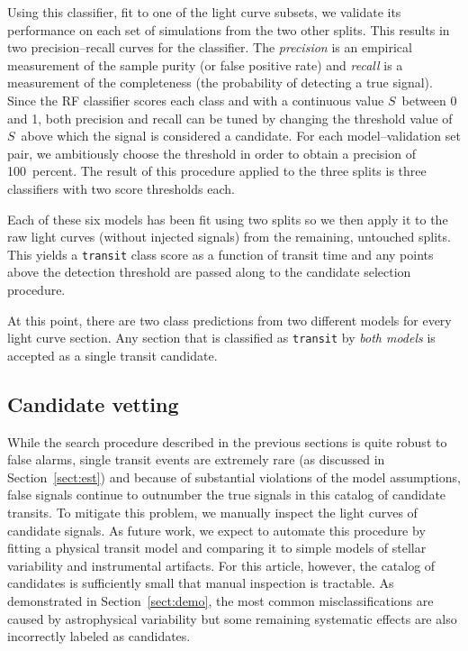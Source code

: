 \documentclass[12pt,preprint]{aastex}
\newcommand{\paper}{article}
\newcommand{\sectionname}{Section}
\newcommand{\sectref}[1]{\ref{sect:#1}}
\newcommand{\Sect}[1]{\sectionname~\sectref{#1}}
\newcommand{\sect}[1]{\Sect{#1}}
\newcommand{\sectlabel}[1]{\label{sect:#1}}
\newcommand{\todo}[3]{{\color{#2}\emph{#1}: #3}}
\newcommand{\dfmtodo}[1]{\todo{DFM}{red}{#1}}
\newcommand{\score}{{\ensuremath{S}}}
\begin{document}
Using this classifier, fit to one of the light curve subsets, we validate its
performance on each set of simulations from the two other splits.
This results in two precision--recall curves for the classifier.
The \emph{precision} is an empirical measurement of the sample purity (or
false positive rate) and \emph{recall} is a measurement of the completeness
(the probability of detecting a true signal).
Since the RF classifier scores each class and with a continuous value \score\
between 0 and 1, both precision and recall can be tuned by changing the
threshold value of \score\ above which the signal is considered a candidate.
For each model--validation set pair, we ambitiously choose the threshold in
order to obtain a precision of 100~percent.
The result of this procedure applied to the three splits is three classifiers
with two score thresholds each.

Each of these six models has been fit using two splits so we then apply it to
the raw light curves (without injected signals) from the remaining, untouched
splits.
This yields a \texttt{transit} class score as a function of transit time and
any points above the detection threshold are passed along to the candidate
selection procedure.

At this point, there are two class predictions from two different models for
every light curve section.
Any section that is classified as \texttt{transit} by \emph{both models} is
accepted as a single transit candidate.



\subsection{Candidate vetting}\sectlabel{vetting}

While the search procedure described in the previous sections is quite robust
to false alarms, single transit events are extremely rare (as discussed in
\sect{est}) and because of substantial violations of the model assumptions,
false signals continue to outnumber the true signals in this catalog of
candidate transits.
To mitigate this problem, we manually inspect the light curves of candidate
signals.
As future work, we expect to automate this procedure by fitting a physical
transit model and comparing it to simple models of stellar variability and
instrumental artifacts.
For this \paper, however, the catalog of candidates is sufficiently small that
manual inspection is tractable.
As demonstrated in \sect{demo}, the most common misclassifications are caused
by astrophysical variability but some remaining systematic effects are also
incorrectly labeled as candidates.
\end{document}
